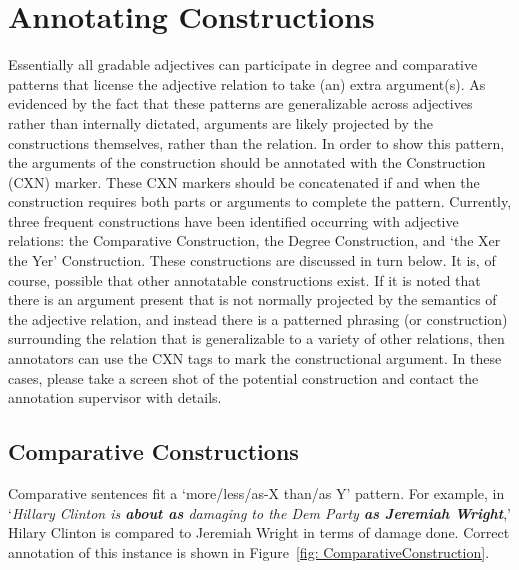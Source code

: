 \documentclass[11pt]{report}
\begin{document}
\section{Annotating Constructions}
Essentially all gradable adjectives can participate in degree and comparative patterns that license the adjective relation to take (an) extra argument(s). As evidenced by the fact that these patterns are generalizable across adjectives rather than internally dictated, arguments are likely projected by the constructions themselves, rather than the relation. In order to show this pattern, the arguments of the construction should be annotated with the Construction (CXN) marker. These CXN markers should be concatenated if and when the construction requires both parts or arguments to complete the pattern.  Currently, three frequent constructions have been identified occurring with adjective relations: the Comparative Construction, the Degree Construction, and `the Xer the Yer' Construction.  These constructions are discussed in turn below. It is, of course, possible that other annotatable constructions exist.  If it is noted that there is an argument present that is not normally projected by the semantics of the adjective relation, and instead there is a patterned phrasing (or construction) surrounding the relation that is generalizable to a variety of other relations, then annotators can use the CXN tags to mark the constructional argument.  In these cases, please take a screen shot of the potential construction and contact the annotation supervisor with details.  

\subsection{Comparative Constructions}
Comparative sentences fit a `more/less/as-X than/as Y' pattern. For example, in `\textit{Hillary Clinton is \textbf{about as} damaging to the Dem Party \textbf{as Jeremiah Wright}},' Hilary Clinton is compared to Jeremiah Wright in terms of damage done.  Correct annotation of this instance is shown in Figure~\ref{fig: ComparativeConstruction}. 
	
\end{document}
